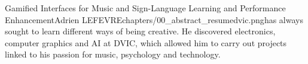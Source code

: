 \begin{thesis}{Gamified Interfaces for Music and Sign-Language Learning and Performance Enhancement}{Adrien LEFEVRE}{chapters/00_abstract_resume}{dvic.png}{has always sought to learn different ways of being creative. He discovered electronics, computer graphics and AI at DVIC, which allowed him to carry out projects linked to his passion for music, psychology and technology.}
 
   
\end{thesis}

\afterpage{\blankpage}
